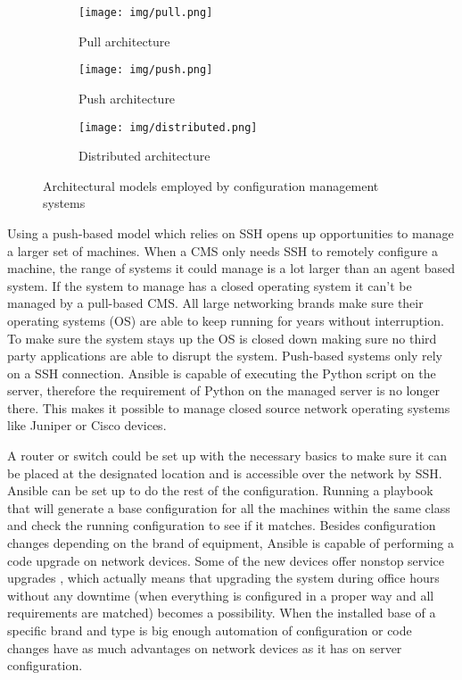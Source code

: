 \begin{figure}[H]
\centering
\begin{subfigure}{.33\textwidth}
  \centering
  \texttt{[image: img/pull.png]}
  \caption{Pull architecture}
  \label{fig:sub1}
\end{subfigure}%
\begin{subfigure}{.33\textwidth}
  \centering
  \texttt{[image: img/push.png]}
  \caption{Push architecture}
  \label{fig:sub2}
\end{subfigure}
\begin{subfigure}{.33\textwidth}
  \centering
  \texttt{[image: img/distributed.png]}
  \caption{Distributed architecture}
  \label{fig:sub3}
\end{subfigure}
\caption{Architectural models employed by configuration management systems}
\label{fig:archmodel}
\end{figure}
\noindent
Using a push-based model which relies on SSH opens up opportunities to manage a larger set of machines. When a CMS only needs SSH to remotely configure a machine, the range of systems it could manage is a lot larger than an agent based system. If the system to manage has a closed operating system it can't be managed by a pull-based CMS. All large networking brands make sure their operating systems (OS) are able to keep running for years without interruption. To make sure the system stays up the OS is closed down making sure no third party applications are able to disrupt the system. Push-based systems only rely on a SSH connection. Ansible is capable of executing the Python script on the server, therefore the requirement of Python on the managed server is no longer there. This makes it possible to manage closed source network operating systems like Juniper or Cisco devices. 

A router or switch could be set up with the necessary basics to make sure it can be placed at the designated location and is accessible over the network by SSH. Ansible can be set up to do the rest of the configuration. Running a playbook that will generate a base configuration for all the machines within the same class and check the running configuration to see if it matches. Besides configuration changes depending on the brand of equipment, Ansible is capable of performing a code upgrade on network devices. Some of the new devices offer nonstop service upgrades \cite{NSSU}\cite{ISSU}, which actually means that upgrading the system during office hours without any downtime (when everything is configured in a proper way and all requirements are matched) becomes a possibility. When the installed base of a specific brand and type is big enough automation of configuration or code changes have as much advantages on network devices as it has on server configuration.

